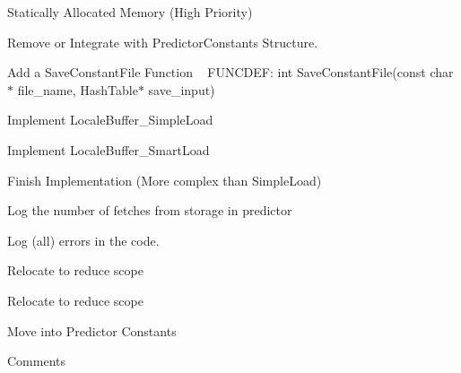 \begin{DoxyRefList}
Statically Allocated Memory (High Priority)  
\item[Global \doxylink{predictor_8h_a4e6f06fbe7f6b462853492abfbd0bec2}{kC} ]\label{todo__todo000022}%
%
Remove or Integrate with Predictor\+Constants Structure.  
\item[File \doxylink{load__constants_8h}{load\+\_\+constants.h} ]\label{todo__todo000003}%
%
Add a Save\+Constant\+File Function ~\newline
FUNCDEF\+: int Save\+Constant\+File(const char\texorpdfstring{$\ast$}{*} file\+\_\+name, Hash\+Table\texorpdfstring{$\ast$}{*} save\+\_\+input)  
\item[File \doxylink{locale__buffer_8h}{locale\+\_\+buffer.h} ]\label{todo__todo000011}%
%
Implement Locale\+Buffer\+\_\+\+Simple\+Load 



Implement Locale\+Buffer\+\_\+\+Smart\+Load  
\item[Global \doxylink{locale__buffer_8h_aafe3d5c7c1f0f2b689902c0bf1f7e4eb}{Locale\+Buffer\+\_\+\+Smart\+Load} (\doxylink{struct_locale_buffer}{Locale\+Buffer} \texorpdfstring{$\ast$}{*}buf, image \texorpdfstring{$\ast$}{*}h\+IMG)]\label{todo__todo000012}%
%
Finish Implementation (More complex than Simple\+Load)  
\item[File \doxylink{logs_8h}{logs.h} ]\label{todo__todo000014}%
%
Log the number of fetches from storage in predictor 



Log (all) errors in the code.  
\item[Global \doxylink{math__functions_8h_adf11110e70a4ca4a966622288d194681}{Manhattan2} (\doxylink{structdim2}{dim2} pt1, \doxylink{structdim2}{dim2} pt2)]\label{todo__todo000019}%
%
Relocate to reduce scope  
\item[Global \doxylink{math__functions_8h_ace80df346398f6e153166e87cee41d47}{Manhattan3} (\doxylink{structdim3}{dim3} pt1, \doxylink{structdim3}{dim3} pt2)]\label{todo__todo000020}%
%
Relocate to reduce scope  
\item[Global \doxylink{sample__representative_8h_a0ed063d2db07cb63fecfb70cffec43f1}{offset} \mbox{[}\mbox{]}]\label{todo__todo000025}%
%
Move into Predictor Constants  
\item[File \doxylink{predictor__constants_8h}{predictor\+\_\+constants.h} ]\label{todo__todo000004}%
%
Comments 




\end{DoxyRefList}

